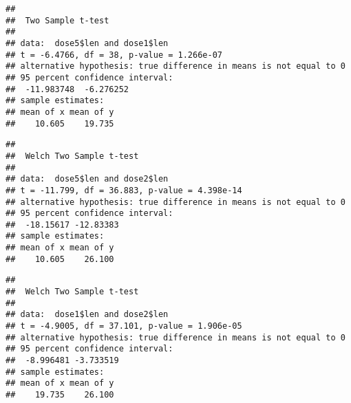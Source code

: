 \documentclass[
]{article}
\newenvironment{Shaded}{\begin{snugshade}}{\end{snugshade}}
\newcommand{\AttributeTok}[1]{\textcolor[rgb]{0.77,0.63,0.00}{#1}}
\newcommand{\DocumentationTok}[1]{\textcolor[rgb]{0.56,0.35,0.01}{\textbf{\textit{#1}}}}
\newcommand{\FunctionTok}[1]{\textcolor[rgb]{0.00,0.00,0.00}{#1}}
\newcommand{\NormalTok}[1]{#1}
\newcommand{\SpecialCharTok}[1]{\textcolor[rgb]{0.00,0.00,0.00}{#1}}
\begin{document}
\begin{Shaded}
\end{Shaded}

\begin{verbatim}
## 
##  Two Sample t-test
## 
## data:  dose5$len and dose1$len
## t = -6.4766, df = 38, p-value = 1.266e-07
## alternative hypothesis: true difference in means is not equal to 0
## 95 percent confidence interval:
##  -11.983748  -6.276252
## sample estimates:
## mean of x mean of y 
##    10.605    19.735
\end{verbatim}

\begin{Shaded}
\end{Shaded}

\begin{verbatim}
## 
##  Welch Two Sample t-test
## 
## data:  dose5$len and dose2$len
## t = -11.799, df = 36.883, p-value = 4.398e-14
## alternative hypothesis: true difference in means is not equal to 0
## 95 percent confidence interval:
##  -18.15617 -12.83383
## sample estimates:
## mean of x mean of y 
##    10.605    26.100
\end{verbatim}

\begin{Shaded}
\end{Shaded}

\begin{verbatim}
## 
##  Welch Two Sample t-test
## 
## data:  dose1$len and dose2$len
## t = -4.9005, df = 37.101, p-value = 1.906e-05
## alternative hypothesis: true difference in means is not equal to 0
## 95 percent confidence interval:
##  -8.996481 -3.733519
## sample estimates:
## mean of x mean of y 
##    19.735    26.100
\end{verbatim}
\end{document}

